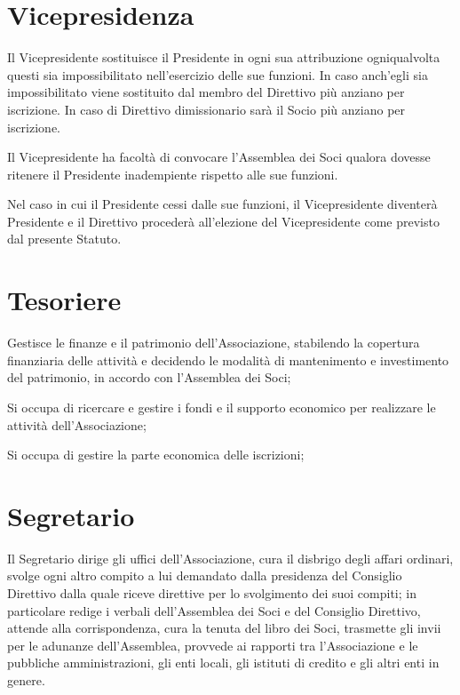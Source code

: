 \documentclass[legalpaper, 11pt]{exam}
\let\tempone\enumerate
\let\temptwo\endenumerate
\renewenvironment{enumerate}{\tempone\addtolength{\itemsep}{-0.45\baselineskip}}{\temptwo}
\begin{document}
{\section{Vicepresidenza}
\begin{enumerate}
 \item Il Vicepresidente sostituisce il Presidente in ogni sua attribuzione ogniqualvolta questi sia impossibilitato nell’esercizio delle sue funzioni. In caso anch’egli sia impossibilitato viene sostituito dal membro del Direttivo più anziano per iscrizione. In caso di Direttivo dimissionario sarà il Socio più anziano per iscrizione.
 \item Il Vicepresidente ha facoltà di convocare l’Assemblea dei Soci qualora dovesse ritenere il Presidente inadempiente rispetto alle sue funzioni.
 \item Nel caso in cui il Presidente cessi dalle sue funzioni, il Vicepresidente diventerà Presidente e il Direttivo procederà all’elezione del Vicepresidente come previsto dal presente Statuto.
\end{enumerate}

\section{Tesoriere}
\begin{enumerate}
 \item Gestisce le finanze e il patrimonio dell’Associazione, stabilendo la copertura finanziaria delle attività e decidendo le modalità di mantenimento e investimento del patrimonio, in accordo con l’Assemblea dei Soci;
 \item Si occupa di ricercare e gestire i fondi e il supporto economico per realizzare le attività dell’Associazione;
 \item Si occupa di gestire la parte economica delle iscrizioni;
\end{enumerate}

\section{Segretario}
\begin{enumerate}
 \item Il Segretario dirige gli uffici dell’Associazione, cura il disbrigo degli affari ordinari, svolge ogni altro compito a lui demandato dalla presidenza del Consiglio Direttivo dalla quale riceve direttive per lo svolgimento dei suoi compiti; in particolare redige i verbali dell’Assemblea dei Soci e del Consiglio Direttivo, attende alla corrispondenza, cura la tenuta del libro dei Soci, trasmette gli invii per le adunanze dell’Assemblea, provvede ai rapporti tra l’Associazione e le pubbliche amministrazioni, gli enti locali, gli istituti di credito e gli altri enti in genere.
\end{enumerate}

}
\end{document}
